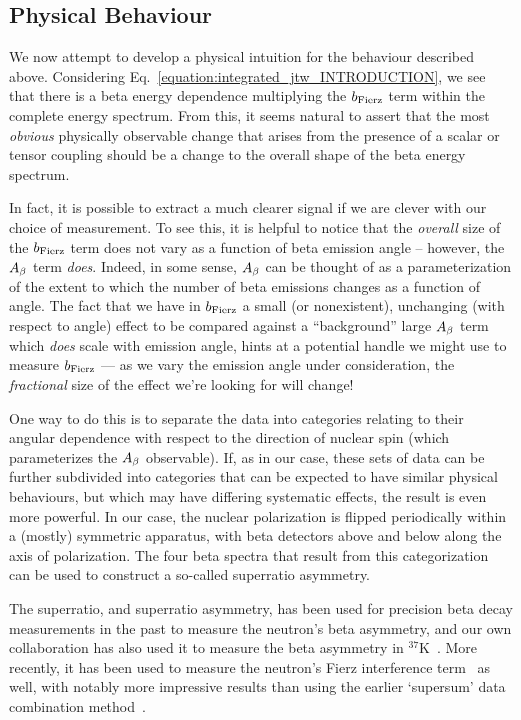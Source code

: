 \subsection{Physical Behaviour}
\label{signature_chapter}
We now attempt to develop a physical intuition for the behaviour described above.  Considering Eq.~\ref{equation:integrated_jtw_INTRODUCTION}, we see that there is a beta energy dependence multiplying the $b_{\mathrm{Fierz}}$ term within the complete energy spectrum.  From this, it seems natural to assert that the most \emph{obvious} physically observable change that arises from the presence of a scalar or tensor coupling should be a change to the overall shape of the beta energy spectrum.  

In fact, it is possible to extract a much clearer signal if we are clever with our choice of measurement.  To see this, it is helpful to notice that the \emph{overall} size of the $b_{\mathrm{Fierz}}$ term does not vary as a function of beta emission angle -- however, the $A_{\beta}$ term \emph{does}.  Indeed, in some sense, $A_{\beta}$ can be thought of as a parameterization of the extent to which the number of beta emissions changes as a function of angle.  The fact that we have in $b_{\mathrm{Fierz}}$ a small (or nonexistent), unchanging (with respect to angle) effect to be compared against a ``background'' large $A_{\beta}$ term which \emph{does} scale with emission angle, hints at a potential handle we might use to measure $b_{\mathrm{Fierz}}$ --- as we vary the emission angle under consideration, the \emph{fractional} size of the effect we're looking for will change!

One way to do this is to separate the data into categories relating to their angular dependence with respect to the direction of nuclear spin (which parameterizes the $A_{\beta}$ observable).  If, as in our case, these sets of data can be further subdivided into categories that can be expected to have similar physical behaviours, but which may have differing systematic effects, the result is even more powerful.  In our case, the nuclear polarization is flipped periodically within a (mostly) symmetric apparatus, with beta detectors above and below along the axis of polarization.  The four beta spectra that result from this categorization can be used to construct a so-called superratio asymmetry.   

The superratio, and superratio asymmetry, has been used for precision beta decay measurements in the past to measure the neutron's beta asymmetry\cite{UCNA_first_superratio}, and our own collaboration has also used it to measure the beta asymmetry in $^{37}$K~\cite{ben_Abeta}.  More recently, it has been used to measure the neutron's Fierz interference term~\cite{UCNAfierz2020}\cite{Saul2020} as well, with notably more impressive results than using the earlier `supersum' data combination method~\cite{UCNA_first_Fierz}.  

